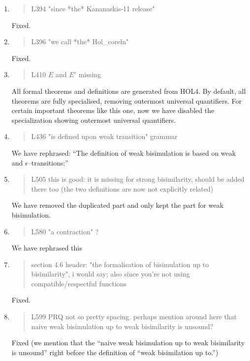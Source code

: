 \begin{enumerate}
\item \begin{quote}
    L394 "since *the* Kananaskis-11 release"
  \end{quote}
  \Mark
  Fixed.

\item \begin{quote}
    L396 "we call *the* Hol_coreln"
  \end{quote}
  \Mark
  Fixed.
  
\item \begin{quote}
    L410 $E$ and $E'$ missing
  \end{quote}
  \Mark
  All formal theorems and definitions are generated from HOL4.
  By default, all theorems are fully specialised, removing outermost
  universal quantifiers. For certain important theorems like this one,
  now we have disabled the specialization showing outermost
  universal quantifiers.
  
\item \begin{quote}
    L436 "is defined upon weak transition" grammar
  \end{quote}

  \Mark
 We have rephrased: ``The definition of weak bisimulation is based on weak
  and $\epsilon$--transitions:''
  
\item \begin{quote}
    L505 this is good: it is missing for strong bisimilarity, should
    be added there too (the two definitions are now not explicitly
    related)
  \end{quote}
  \Mark
  We have removed the duplicated part and only kept the part for weak bisimulation.

\item \begin{quote}
    L580 "a contraction" ?
  \end{quote}
  \Mark
 We have rephrased this
  
\item \begin{quote}
    section 4.6 header: "the formalisation of bisimulation up to
    bisimilarity", i would say; also since you're not using
    compatible/respectful functions
  \end{quote}
  \Mark
  Fixed.
  
\item \begin{quote}
    L599 PRQ not so pretty spacing. perhaps mention around here that
    naive weak bisimulation up to weak bisimilarity is unsound?
  \end{quote}
  \Mark
  Fixed (we mention that the ``naive weak bisimulation up to weak
  bisimilarity is unsound'' right before the definition of ``weak
  bisimilation up to.'')
  

\end{enumerate}
